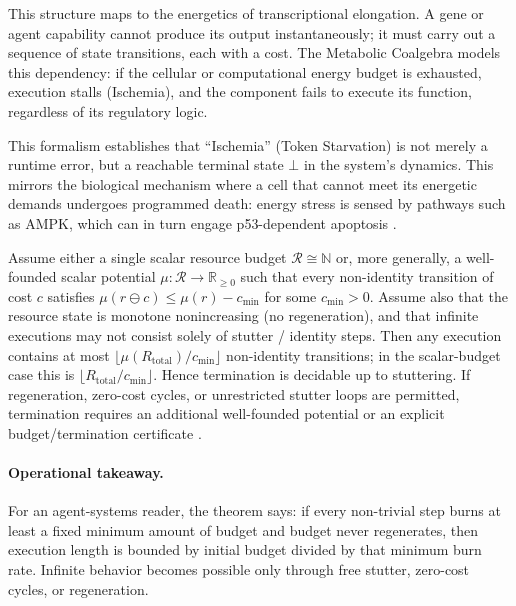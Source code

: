 This structure maps to the energetics of transcriptional elongation. A gene or agent capability cannot produce its output instantaneously; it must carry out a sequence of state transitions, each with a cost. The Metabolic Coalgebra models this dependency: if the cellular or computational energy budget is exhausted, execution stalls (Ischemia), and the component fails to execute its function, regardless of its regulatory logic.

This formalism establishes that ``Ischemia'' (Token Starvation) is not merely a runtime error, but a reachable terminal state $\bot$ in the system's dynamics. This mirrors the biological mechanism where a cell that cannot meet its energetic demands undergoes programmed death: energy stress is sensed by pathways such as AMPK, which can in turn engage p53-dependent apoptosis \cite{aubrey2018p53}.


\begin{theorem}\label{thm:metabolic-bound}
Assume either a single scalar resource budget $\mathcal{R} \cong \mathbb{N}$ or, more generally, a well-founded scalar potential $\mu: \mathcal{R} \to \mathbb{R}_{\ge 0}$ such that every non-identity transition of cost $c$ satisfies $\mu(r \ominus c) \le \mu(r) - c_{\min}$ for some $c_{\min} > 0$. Assume also that the resource state is monotone nonincreasing (no regeneration), and that infinite executions may not consist solely of stutter / identity steps. Then any execution contains at most $\lfloor \mu(R_{\mathrm{total}}) / c_{\min} \rfloor$ non-identity transitions; in the scalar-budget case this is $\lfloor R_{\mathrm{total}} / c_{\min} \rfloor$. Hence termination is decidable up to stuttering. If regeneration, zero-cost cycles, or unrestricted stutter loops are permitted, termination requires an additional well-founded potential or an explicit budget/termination certificate \cite{boreale2023weighted}.
\end{theorem}

\paragraph{Operational takeaway.}
For an agent-systems reader, the theorem says: if every non-trivial step burns at least a fixed minimum amount of budget and budget never regenerates, then execution length is bounded by initial budget divided by that minimum burn rate. Infinite behavior becomes possible only through free stutter, zero-cost cycles, or regeneration.

